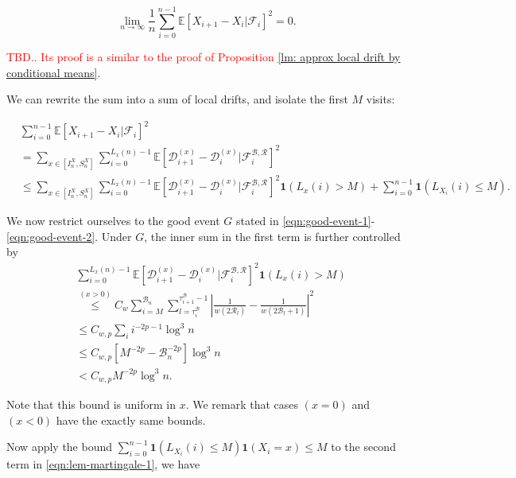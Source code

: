 \documentclass[twoside,12pt,a4paper]{article}
\numberwithin{equation}{section}
\newcommand\TBD{\textcolor{red}{TBD.}}
\begin{document}
{\[
	 \lim_{n \to \infty } \frac{1}{n} \sum_{i = 0}^{n-1} \mathbb{E}\left[ X_{i+1} - X_i | \mathcal{F}_i \right]^2 = 0
.\] 

\textcolor{red}{\TBD. Its proof is a similar to the proof of Proposition \ref{lm: approx local drift by conditional means}}.

We can rewrite the sum into a sum of local drifts, and isolate the first $M$ visits:

\begin{align}
	&\sum_{i = 0}^{n-1} \mathbb{E}\left[ X_{i+1} - X_i | \mathcal{F}_i \right]^2\\
	&= \sum_{x \in \left[ I_n^X, S_n^X \right]} \sum_{i = 0}^{L_x(n) - 1} \mathbb{E}\left[ \mathcal{D}_{i+1}^{(x)} - \mathcal{D}_i^{(x)} | \mathcal{F}_{i}^{\mathcal{B}, \mathcal{R}} \right]^2  \\
	&\le  \sum_{x \in \left[ I_n^X, S_n^X \right]} \sum_{i = 0}^{L_x(n) - 1} \mathbb{E}\left[ \mathcal{D}_{i+1}^{(x)} - \mathcal{D}_i^{(x)} | \mathcal{F}_{i}^{\mathcal{B}, \mathcal{R}} \right]^2 \mathbf{1}\left( L_x(i) > M \right) + 
	\sum_{i = 0}^{n - 1} \mathbf{1}\left( L_{X_i}(i) \le  M \right) 
	\label{eqn:lem-martingale-1}
.\end{align}

We now restrict ourselves to the good event $G$ stated in \eqref{eqn:good-event-1}-\eqref{eqn:good-event-2}. Under $G$,
the inner sum in the first term is further controlled by
\begin{align*}
	&\sum_{i =0}^{ L_x(n) - 1} \mathbb{E}\left[ \mathcal{D}_{i+1}^{(x)} - \mathcal{D}_i^{(x)} | \mathcal{F}_{i}^{\mathcal{B}, \mathcal{R}} \right]^2 \mathbf{1}\left( L_{x}(i) > M \right) \\
	&\stackrel{(x > 0)}{\le} C_w \sum_{i = M}^{\mathcal{B}_n} \sum_{l = \tau_i^{\mathcal{B}}}^{\tau_{i+1}^{\mathcal{B}}-1} 
	\left| \frac{1}{w(2 \mathcal{R}_l)} - \frac{1}{w\left( 2 \mathcal{B}_l + 1 \right) } \right|^2 \\
	&\le C_{w, p} \sum_i i^{- 2 p - 1} \log^3 n \\
	&\le C_{w, p} \left[ M^{- 2 p} - \mathcal{B}_n^{- 2 p} \right] \log^3 n  \\
	&< C_{w, p} M^{-2 p} \log^3 n
	.
\end{align*}

Note that this bound is uniform in $x$. We remark that cases $(x=0)$ and $(x < 0)$ have the exactly same bounds. 

Now apply the bound $\sum_{i = 0}^{n-1} \mathbf{1}\left( L_{X_i}(i) \le M \right) \mathbf{1}(X_i = x) \le  M$ to the second term in \eqref{eqn:lem-martingale-1}, we have

}
\end{document}
